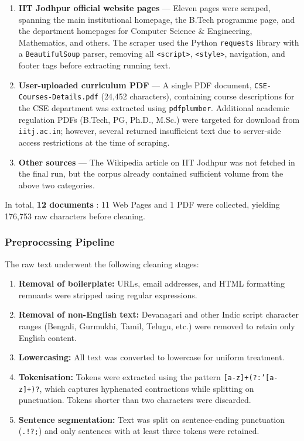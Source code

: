 \documentclass[12pt, a4paper]{article}
\begin{document}
\begin{enumerate}[label=(\roman*)]
  \item \textbf{IIT Jodhpur official website pages} --- Eleven pages were scraped, spanning the main institutional homepage, the B.Tech programme page, and the department homepages for Computer Science \& Engineering, Mathematics, and others. The scraper used the Python \texttt{requests} library with a \texttt{BeautifulSoup} parser, removing all \texttt{<script>}, \texttt{<style>}, navigation, and footer tags before extracting running text.
  \item \textbf{User-uploaded curriculum PDF} --- A single PDF document, \texttt{CSE-Courses-Details.pdf} (24,452 characters), containing course descriptions for the CSE department was extracted using \texttt{pdfplumber}. Additional academic regulation PDFs (B.Tech, PG, Ph.D., M.Sc.) were targeted for download from \texttt{iitj.ac.in}; however, several returned insufficient text due to server-side access restrictions at the time of scraping.
  \item \textbf{Other sources} --- The Wikipedia article on IIT Jodhpur was not fetched in the final run, but the corpus already contained sufficient volume from the above two categories.
\end{enumerate}

In total, \textbf{12 documents} : 11 Web Pages and 1 PDF were collected, yielding 176,753 raw characters before cleaning.

\subsubsection{Preprocessing Pipeline}

The raw text underwent the following cleaning stages:

\begin{enumerate}[label=\arabic*.]
  \item \textbf{Removal of boilerplate:} URLs, email addresses, and HTML formatting remnants were stripped using regular expressions.
  \item \textbf{Removal of non-English text:} Devanagari and other Indic script character ranges (Bengali, Gurmukhi, Tamil, Telugu, etc.) were removed to retain only English content.
  \item \textbf{Lowercasing:} All text was converted to lowercase for uniform treatment.
  \item \textbf{Tokenisation:} Tokens were extracted using the pattern \texttt{[a-z]+(?:'[a-z]+)?}, which captures hyphenated contractions while splitting on punctuation. Tokens shorter than two characters were discarded.
  \item \textbf{Sentence segmentation:} Text was split on sentence-ending punctuation (\texttt{.!?;}) and only sentences with at least three tokens were retained.
\end{enumerate}
\end{document}
